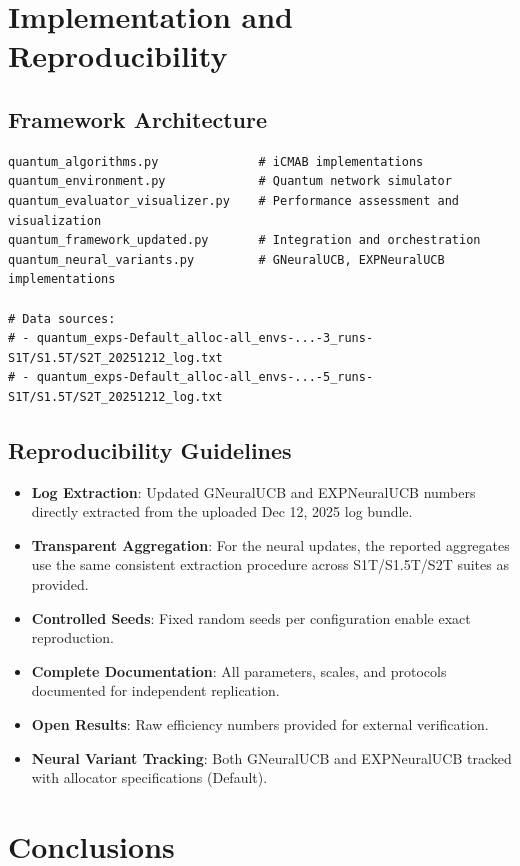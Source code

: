 \documentclass[12pt,a4paper]{article}
\begin{document}
\section{Implementation and Reproducibility}

\subsection{Framework Architecture}
\begin{lstlisting}[caption=Core iCMAB and Neural Framework Components]
quantum_algorithms.py              # iCMAB implementations
quantum_environment.py             # Quantum network simulator
quantum_evaluator_visualizer.py    # Performance assessment and visualization
quantum_framework_updated.py       # Integration and orchestration
quantum_neural_variants.py         # GNeuralUCB, EXPNeuralUCB implementations

# Data sources:
# - quantum_exps-Default_alloc-all_envs-...-3_runs-S1T/S1.5T/S2T_20251212_log.txt
# - quantum_exps-Default_alloc-all_envs-...-5_runs-S1T/S1.5T/S2T_20251212_log.txt
\end{lstlisting}

\subsection{Reproducibility Guidelines}
\begin{itemize}
\item \textbf{Log Extraction}: Updated GNeuralUCB and EXPNeuralUCB numbers directly extracted from the uploaded Dec 12, 2025 log bundle.
\item \textbf{Transparent Aggregation}: For the neural updates, the reported aggregates use the same consistent extraction procedure across S1T/S1.5T/S2T suites as provided.
\item \textbf{Controlled Seeds}: Fixed random seeds per configuration enable exact reproduction.
\item \textbf{Complete Documentation}: All parameters, scales, and protocols documented for independent replication.
\item \textbf{Open Results}: Raw efficiency numbers provided for external verification.
\item \textbf{Neural Variant Tracking}: Both GNeuralUCB and EXPNeuralUCB tracked with allocator specifications (Default).
\end{itemize}

\newpage
\section{Conclusions}
\end{document}
